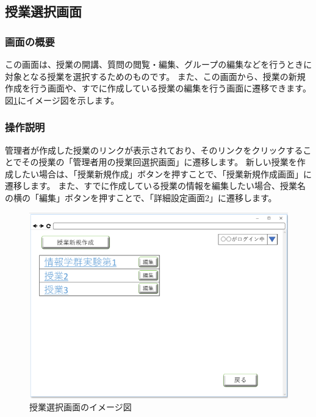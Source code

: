 
\newpage

\subsection{授業選択画面}
\subsubsection{画面の概要}
この画面は、授業の開講、質問の閲覧・編集、グループの編集などを行うときに対象となる授業を選択するためのものです。
また、この画面から、授業の新規作成を行う画面や、すでに作成している授業の編集を行う画面に遷移できます。
図\ref{fig:09}にイメージ図を示します。

\subsubsection{操作説明}
管理者が作成した授業のリンクが表示されており、そのリンクをクリックすることでその授業の「管理者用の授業回選択画面」に遷移します。
新しい授業を作成したい場合は、「授業新規作成」ボタンを押すことで、「授業新規作成画面」に遷移します。
また、すでに作成している授業の情報を編集したい場合、授業名の横の「編集」ボタンを押すことで、「詳細設定画面2」に遷移します。

\begin{figure}[htbp]
  \begin{center}
    \includegraphics[width=0.7\linewidth,clip]{./img/09.png}
    \caption{授業選択画面のイメージ図}\label{fig:09}
  \end{center}
\end{figure}

